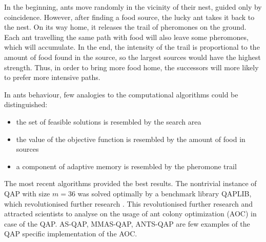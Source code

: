 In the beginning, ants move randomly in the vicinity of their nest, guided only by coincidence.
However, after finding a food source, the lucky ant takes it back to the nest.
On its way home, it releases the trail of pheromones on the ground.
Each ant travelling the same path with food will also leave some pheromones, which will accumulate.
In the end, the intensity of the trail is proportional to the amount of food found in the source, so the largest sources would have the highest strength.
Thus, in order to bring more food home, the successors will more likely to prefer more intensive paths.

In ants behaviour, few analogies to the computational algorithms could be distinguished:
\begin{itemize}
  \item the set of feasible solutions is resembled by the search area
  \item the value of the objective function is resembled by the amount of food in sources
  \item a component of adaptive memory is resembled by the pheromone trail
\end{itemize}

The most recent algorithms provided the best results.
The nontrivial instance of QAP with size $ m = 36 $ was solved optimally by a benchmark library QAPLIB, which revolutionised further research \cite{dorigo2004ant}.
This revolutionised further research and attracted scientists to analyse on the usage of ant colony optimization (AOC) in case of the QAP.
AS-QAP, MMAS-QAP, ANTS-QAP are few examples of the QAP specific implementation of the AOC.

